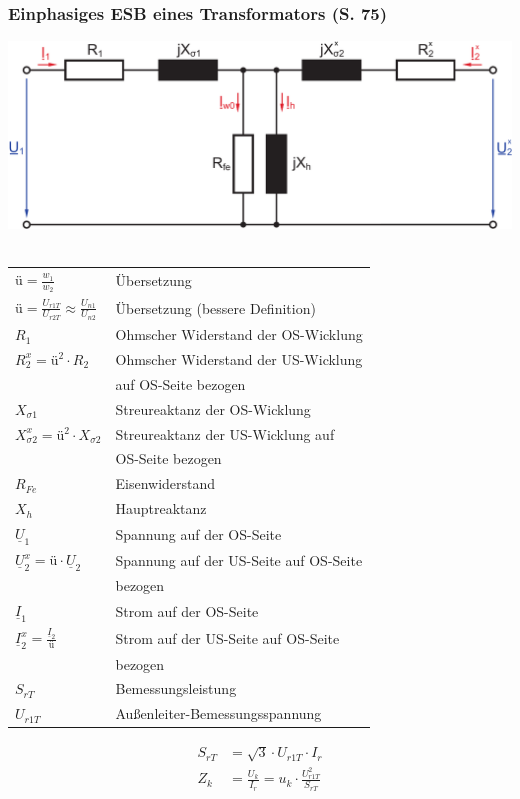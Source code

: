 \documentclass[a4paper,twocolumn,10pt]{article}
\begin{document}
\subsubsection{Einphasiges ESB eines Transformators (S. 75)}
\includegraphics[width=0.9\columnwidth]{Grafiken/Trafo_ESB}\\\\
\begin{tabular}{ll}
$\text{ü}=\frac{w_1}{w_2}$ & Übersetzung\\
$\text{ü}=\frac{U_{r1T}}{U_{r2T}}\approx\frac{U_{n1}}{U_{n2}}$ & Übersetzung (bessere Definition)\\
$R_1$ & Ohmscher Widerstand der OS-Wicklung\\
$R_2^x=\text{ü}^2\cdot R_2$ & Ohmscher Widerstand der US-Wicklung\\
& auf OS-Seite bezogen\\
$X_{\sigma 1}$ & Streureaktanz der OS-Wicklung\\
$X_{\sigma2}^x=\text{ü}^2\cdot X_{\sigma 2}$ & Streureaktanz der US-Wicklung auf\\
&OS-Seite bezogen\\
$R_{Fe}$ & Eisenwiderstand\\
$X_h$ & Hauptreaktanz\\
$\underline{U}_1$ & Spannung auf der OS-Seite\\
$\underline{U}_2^x=\text{ü}\cdot\underline{U}_2$ & Spannung auf der US-Seite auf OS-Seite\\
& bezogen\\
$\underline{I}_1$ & Strom auf der OS-Seite\\
$\underline{I}_2^x=\frac{\underline{I}_2}{\text{ü}}$ & Strom auf der US-Seite auf OS-Seite\\
& bezogen\\
$S_{rT}$ & Bemessungsleistung\\
$U_{r1T}$ & Außenleiter-Bemessungsspannung
\end{tabular}
\begin{equation*}
\begin{split}
S_{rT}&=\sqrt{3}\cdot U_{r1T}\cdot I_r\\
Z_k&=\frac{U_k}{I_r}=u_k\cdot\frac{U_{r1T}^2}{S_{rT}}
\end{split}
\end{equation*}
\end{document}
